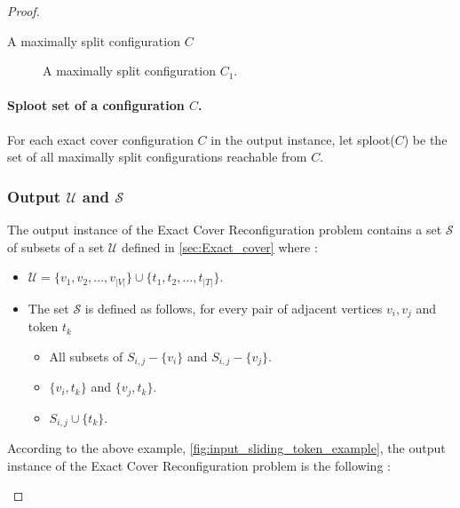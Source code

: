 \begin{proof}
\begin{example}{A maximally split configuration $C$}
  \begin{figure}[h!]
    \begin{center}
      \begin{scaletikzpicturetowidth}{\textwidth}
      \end{scaletikzpicturetowidth}
    \end{center}
    \caption{A maximally split configuration $C_1$.}
    \label{}
  \end{figure}
\end{example}

\paragraph{Sploot set of a configuration $C$.}
For each exact cover configuration $C$ in the output instance, let sploot($C$) be the set of all maximally split configurations reachable from $C$.


\subsubsection{Output $\mathcal{U}$ and $\mathcal{S}$}\label{subsubsection:output_instance}
The output instance of the Exact Cover Reconfiguration problem contains a set $\mathcal{S}$ of subsets of a set $\mathcal{U}$ defined in
\ref{sec:Exact_cover} where :
\begin{itemize}
  \item $\mathcal{U} = \{v_1, v_2, \dots, v_{|V|}\} \cup \{t_1, t_2, \dots, t_{|T|}\}.$
  \item The set $\mathcal{S}$ is defined as follows, for every pair of adjacent vertices $v_i, v_j$ and token $t_k$
    \begin{itemize}
      \item All subsets of $S_{i,j} - \{v_i\}$ and $S_{i,j} - \{v_j\}$.
      \item $\{v_i, t_k\}$ and $\{v_j , t_k\}$.
      \item $S_{i,j} \cup \{t_k\}$.
    \end{itemize}
\end{itemize}

\begin{example}According to the above example, \ref{fig:input_sliding_token_example}, the output instance of the Exact Cover Reconfiguration
problem is the following : 
\end{example}


\end{proof}
